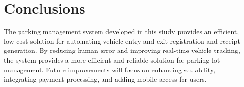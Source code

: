 \section{Conclusions}
The parking management system developed in this study provides an efficient, low-cost solution for automating vehicle entry and exit registration and receipt generation. By reducing human error and improving real-time vehicle tracking, the system provides a more efficient and reliable solution for parking lot management. Future improvements will focus on enhancing scalability, integrating payment processing, and adding mobile access for users.
